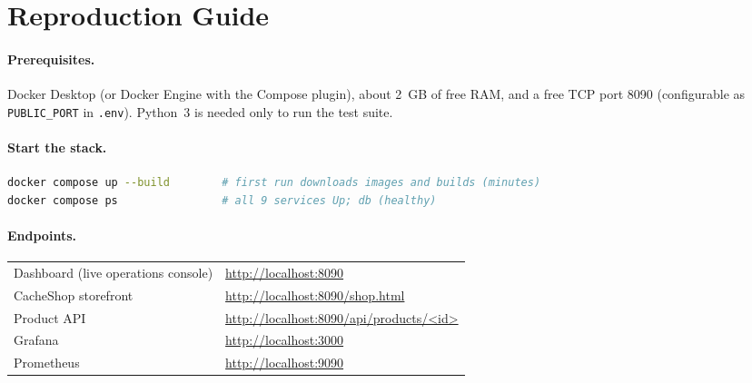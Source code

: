 
\section{Reproduction Guide}
\label{app:repro}

\paragraph{Prerequisites.} Docker Desktop (or Docker Engine with the Compose plugin),
about 2~GB of free RAM, and a free TCP port 8090 (configurable as \texttt{PUBLIC\_PORT}
in \texttt{.env}). Python~3 is needed only to run the test suite.

\paragraph{Start the stack.}
\begin{lstlisting}[language=bash, numbers=none]
docker compose up --build        # first run downloads images and builds (minutes)
docker compose ps                # all 9 services Up; db (healthy)
\end{lstlisting}

\paragraph{Endpoints.}
\begin{center}
\small
\begin{tabular}{@{}ll@{}}
\toprule
Dashboard (live operations console) & \url{http://localhost:8090} \\
CacheShop storefront & \url{http://localhost:8090/shop.html} \\
Product API & \url{http://localhost:8090/api/products/<id>} \\
Grafana & \url{http://localhost:3000} \\
Prometheus & \url{http://localhost:9090} \\
\bottomrule
\end{tabular}
\end{center}

